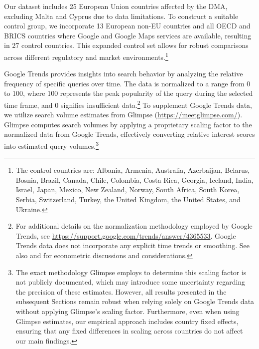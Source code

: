 \documentclass[11pt]{article}
\begin{document}
	Our dataset includes 25 European Union countries affected by the DMA, excluding Malta and Cyprus due to data limitations. To construct a suitable control group, we incorporate 13 European non-EU countries and all OECD and BRICS countries where Google and Google Maps services are available, resulting in 27 control countries. This expanded control set allows for robust comparisons across different regulatory and market environments.\footnote{The control countries are: Albania, Armenia, Australia, Azerbaijan, Belarus, Bosnia, Brazil, Canada, Chile, Colombia, Costa Rica, Georgia, Iceland, India, Israel, Japan, Mexico, New Zealand, Norway, South Africa, South Korea, Serbia, Switzerland, Turkey, the United Kingdom, the United States, and Ukraine.}
	
	
	Google Trends provides insights into search behavior by analyzing the relative frequency of specific queries over time. The data is normalized to a range from 0 to 100, where 100 represents the peak popularity of the query during the selected time frame, and 0 signifies insufficient data.\footnote{For additional details on the normalization methodology employed by Google Trends, see \href{https://support.google.com/trends/answer/4365533}{https://support.google.com/trends/answer/4365533}. Google Trends data does not incorporate any explicit time trends or smoothing. See also \cite{covid2021} and \cite{JBR2021} for econometric discussions and considerations.} To supplement Google Trends data, we utilize search volume estimates from Glimpse (\href{https://meetglimpse.com/}{https://meetglimpse.com/}). Glimpse computes search volumes by applying a proprietary scaling factor to the normalized data from
	Google Trends, effectively converting relative interest scores into estimated query volumes.\footnote{The exact methodology Glimpse employs to determine this scaling factor is not publicly documented, which may introduce some uncertainty regarding the precision of these estimates. However, all results presented in the subsequent Sections remain robust when relying solely on Google Trends data without applying Glimpse's scaling factor. Furthermore, even when using Glimpse estimates, our empirical approach includes country fixed effects, ensuring that any fixed differences in scaling across countries do not affect our main findings.} 
	
\end{document}
